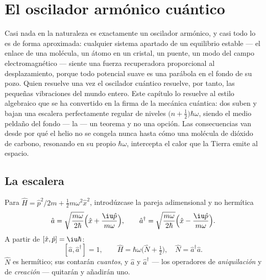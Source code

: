 \chapter{El oscilador armónico cuántico}\label{ch:b3:harmonic-oscillator}

Casi nada en la naturaleza es exactamente un oscilador armónico, y casi todo
lo es de forma aproximada: cualquier sistema apartado de un equilibrio
estable --- el enlace de una molécula, un átomo en un cristal, un puente, un
modo del campo electromagnético --- siente una fuerza recuperadora
proporcional al desplazamiento, porque todo potencial suave es una parábola
en el fondo de su pozo. Quien resuelve una vez el oscilador cuántico
resuelve, por tanto, las pequeñas vibraciones del mundo entero. Este
capítulo lo resuelve al estilo algebraico que se ha convertido en la firma
de la mecánica cuántica: dos  suben y bajan una escalera
perfectamente regular de niveles $\big(n +
\tfrac12\big)\hbar\omega$, siendo el medio peldaño del fondo --- la  --- un teorema y no una opción. Las consecuencias van desde
por qué el helio no se congela nunca hasta cómo una molécula de dióxido de
carbono, resonando en su propio $\hbar\omega$, intercepta el calor que la
Tierra emite al espacio.

\section{La escalera}

\begin{definition}\label{def:b3:harmonic-oscillator:ladder}
Para $\hat H = \hat p^2/2m + \tfrac12 m\omega^2\hat x^2$, introdúzcase la
pareja adimensional y no hermítica
\[
\hat a = \sqrt{\frac{m\omega}{2\hbar}}\Big(\hat x +
\frac{\iu\hat p}{m\omega}\Big) , \qquad
\hat a^\dagger = \sqrt{\frac{m\omega}{2\hbar}}\Big(\hat x -
\frac{\iu\hat p}{m\omega}\Big) .
\]
A partir de $[\hat x, \hat p] = \iu\hbar$:
\[
[\hat a, \hat a^\dagger] = 1 , \qquad
\hat H = \hbar\omega\Big(\hat N + \tfrac12\Big) , \quad
\hat N = \hat a^\dagger\hat a .
\]
$\hat N$ es hermítico; sus  contarán \emph{cuantos}, y
$\hat a$ y $\hat a^\dagger$ --- los operadores de \emph{aniquilación} y de
\emph{creación} --- quitarán y añadirán uno.
\end{definition}

